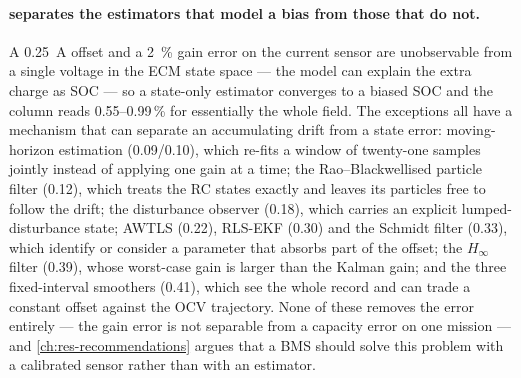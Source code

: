 \paragraph{ separates the estimators that model a bias from those that do not.}
A \SI{0.25}{\ampere} offset and a \SI{2}{\percent} gain error on the current sensor are
unobservable from a single voltage in the ECM state space --- the model can explain the extra
charge as SOC --- so a state-only estimator converges to a biased SOC and the column reads
\num{0.55}--\num{0.99}\,\% for essentially the whole field. The exceptions all have a
mechanism that can separate an accumulating drift from a state error: moving-horizon
estimation (\num{0.09}/\num{0.10}), which re-fits a window of twenty-one samples jointly
instead of applying one gain at a time; the Rao--Blackwellised particle filter (\num{0.12}),
which treats the RC states exactly and leaves its particles free to follow the drift; the
disturbance observer (\num{0.18}), which carries an explicit lumped-disturbance state; AWTLS
(\num{0.22}), RLS-EKF (\num{0.30}) and the Schmidt filter (\num{0.33}), which identify or
consider a parameter that absorbs part of the offset; the $H_\infty$ filter (\num{0.39}),
whose worst-case gain is larger than the Kalman gain; and the three fixed-interval smoothers
(\num{0.41}), which see the whole record and can trade a constant offset against the OCV
trajectory. None of these removes the error entirely --- the gain error is not separable from a
capacity error on one mission --- and \cref{ch:res-recommendations} argues that a BMS should
solve this problem with a calibrated sensor rather than with an estimator.

